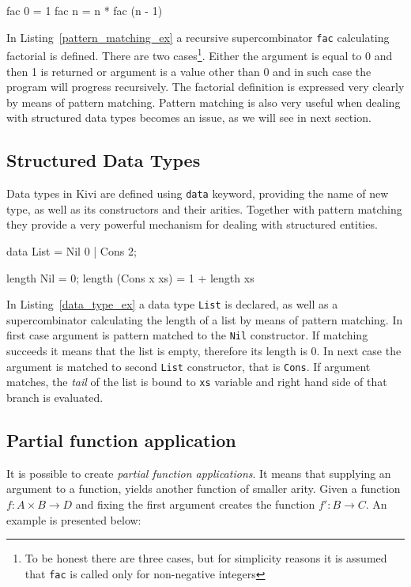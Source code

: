 \documentclass[12pt,a4paper]{report}
\begin{document}
\vspace*{0.2in}
\begin{code}[style=haskell,label=pattern_matching_ex,caption={Factorial using pattern matching.}]
  fac 0 = 1
  fac n = n * fac (n - 1)
\end{code}

In Listing~\ref{pattern_matching_ex} a recursive supercombinator \texttt{fac}
calculating factorial is defined. There are two cases\footnote{To be honest
there are three cases, but for simplicity reasons it is assumed that
\texttt{fac} is called only for non-negative integers}. Either the argument is
equal to 0 and then 1 is returned or argument is a value other than 0 and in
such case the program will progress recursively. The factorial definition is
expressed very clearly by means of pattern matching. Pattern matching is also
very useful when dealing with structured data types becomes an issue, as we
will see in next section.

\subsection{Structured Data Types}
Data types in Kivi are defined using \texttt{data} keyword, providing the name
of new type, as well as its constructors and their arities. Together with
pattern matching they provide a very powerful mechanism for dealing with
structured entities.

\vspace*{0.2in}
\begin{code}[style=haskell,label=data_type_ex,caption={Calculating length of list.}]
  data List = Nil 0 | Cons 2;

  length Nil = 0;
  length (Cons x xs) = 1 + length xs
\end{code}

In Listing~\ref{data_type_ex} a data type \texttt{List} is declared, as well as
a supercombinator calculating the length of a list by means of pattern
matching. In first case argument is pattern matched to the \texttt{Nil}
constructor. If matching succeeds it means that the list is empty, therefore
its length is 0.  In next case the argument is matched to second \texttt{List}
constructor, that is \texttt{Cons}. If argument matches, the \textit{tail} of
the list is bound to \texttt{xs} variable and right hand side of that branch is
evaluated.

\subsection{Partial function application}
It is possible to create \textit{partial function applications}. It means that
supplying an argument to a function, yields another function of smaller arity.
Given a function $f : A \times B \rightarrow D$ and fixing the first argument
creates the function $f' : B \rightarrow C$. An example is presented below:
\end{document}
